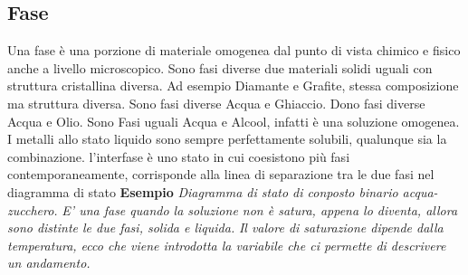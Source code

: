 \documentclass{article}%
\begin{document}
\subsection{ Fase }%
\label{subsec:Fase}%
Una fase è una porzione di materiale omogenea dal punto di vista chimico e fisico anche a livello microscopico.\newline%
%
Sono fasi diverse due materiali solidi uguali con struttura cristallina diversa.\newline%
%
Ad esempio Diamante e Grafite, stessa composizione ma struttura diversa.\newline%
%
Sono fasi diverse Acqua e Ghiaccio.\newline%
%
Dono fasi diverse Acqua e Olio.\newline%
%
Sono Fasi uguali Acqua e Alcool, infatti è una soluzione omogenea.\newline%
%
\newline%
%
I metalli allo stato liquido sono sempre perfettamente solubili, qualunque sia la combinazione.\newline%
%
\newline%
%
l'interfase è uno stato in cui coesistono più fasi contemporaneamente,\newline%
%
corrisponde alla linea di separazione tra le due fasi nel diagramma di stato\newline%
%
\newline%
%
\textbf{ Esempio \newline%
}%
\textit{Diagramma di stato di conposto binario acqua{-}zucchero.\newline%
}%
\textit{E' una fase quando la soluzione non è satura, appena lo diventa, allora sono distinte le due fasi, solida e liquida.\newline%
}%
\textit{Il valore di saturazione dipende dalla temperatura, ecco che viene introdotta la variabile che ci permette di descrivere un andamento.\newline%
}%
\newline%

%
\end{document}
